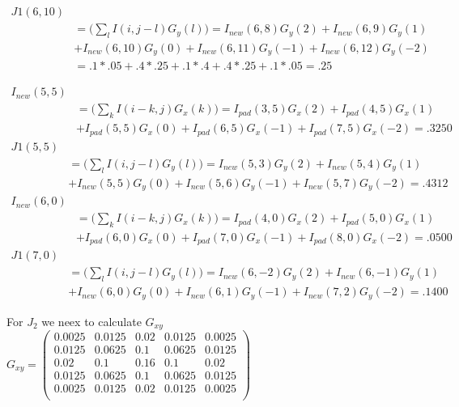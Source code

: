 \documentclass[11pt,english]{article}
\begin{document}
\begin{align*}
J1(6,10) \\
&= \big(\sum_l I(i , j-l) G_y(l)\big)  =  I_{new} (6,8)G_y(2) +  I_{new} (6,9)G_y(1) \\
&+I_{new}(6,10)G_y(0)  + I_{new}(6,11)G_y(-1) +  I_{new}(6,12)G_y(-2) \\
&= .1*.05 + .4*.25 + .1*.4 + .4*.25 + .1*.05= .25  
\end{align*}



\begin{align*} 
  I_{new}(5,5)\\
  &= \big(\sum_k I(i -k, j) G_x(k)\big)  = I_{pad} (3,5)G_x(2) +  I_{pad} (4,5)G_x(1) \\
&+  I_{pad} (5,5)G_x(0)  + I_{pad}(6,5)G_x(-1) +  I_{pad} (7,5)G_x(-2) = .3250  
\end{align*}
\begin{align*} 
J1(5,5)\\ 
&= \big(\sum_l I(i , j-l) G_y(l)\big)  =  I_{new} (5,3)G_y(2) +  I_{new} (5,4)G_y(1)\\
&+  I_{new}(5,5)G_y(0)  + I_{new}(5,6)G_y(-1) +  I_{new}(5,7)G_y(-2) = .4312  
\end{align*}
\begin{align*} 
 I_{new}(6,0)\\ 
&= \big(\sum_k I(i -k, j) G_x(k)\big)  = I_{pad} (4,0)G_x(2) +  I_{pad} (5,0)G_x(1) \\
&+ I_{pad} (6,0)G_x(0)  + I_{pad}(7,0)G_x(-1) +  I_{pad} (8,0)G_x(-2) = .0500 
\end{align*}
\begin{align*} 
J1(7,0) \\
&= \big(\sum_l I(i , j-l) G_y(l)\big)  =  I_{new} (6,-2)G_y(2) +  I_{new} (6,-1)G_y(1)\\
 &+I_{new}(6,0)G_y(0)  + I_{new}(6,1)G_y(-1) +  I_{new}(7,2)G_y(-2) = .1400 
 \end{align*}
 

For $J_2$ we neex to calculate $G_{xy}$ \\ 
 $G_{xy} = 
 \begin{pmatrix}
 0.0025 & 0.0125 & 0.02 & 0.0125 & 0.0025 \\
0.0125 & 0.0625 & 0.1  & 0.0625 & 0.0125 \\
0.02   & 0.1    & 0.16 & 0.1    & 0.02   \\
0.0125 & 0.0625 & 0.1  & 0.0625 & 0.0125 \\
0.0025 & 0.0125 & 0.02 & 0.0125 & 0.0025\\
 \end{pmatrix}
 $
 
\end{document}
